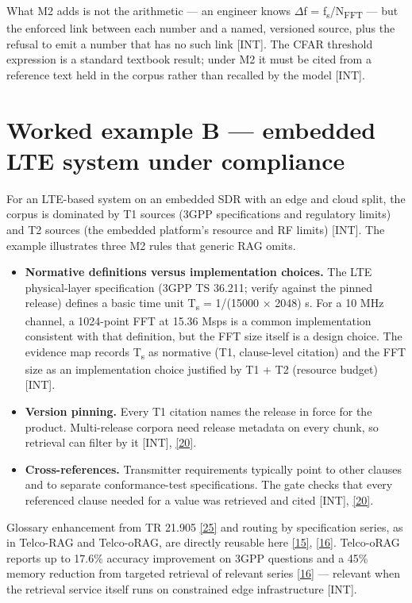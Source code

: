 \documentclass[11pt,a4paper]{article}
\newcommand{\prov}[1]{\textsf{\footnotesize[#1]}}
\begin{document}
What M2 adds is not the arithmetic --- an engineer knows \ensuremath{\Delta}f = f\textsubscript{s}/N\textsubscript{FFT} --- but the enforced link between each number and a named, versioned source, plus the refusal to emit a number that has no such link \prov{INT}. The CFAR threshold expression is a standard textbook result; under M2 it must be cited from a reference text held in the corpus rather than recalled by the model \prov{INT}.

\section{Worked example B --- embedded LTE system under compliance}
For an LTE-based system on an embedded SDR with an edge and cloud split, the corpus is dominated by T1 sources (3GPP specifications and regulatory limits) and T2 sources (the embedded platform's resource and RF limits) \prov{INT}. The example illustrates three M2 rules that generic RAG omits.

\begin{itemize}
\item \textbf{Normative definitions versus implementation choices.} The LTE physical-layer specification (3GPP TS 36.211; verify against the pinned release) defines a basic time unit T\textsubscript{s} = 1/(15000 \ensuremath{\times} 2048) s. For a 10 MHz channel, a 1024-point FFT at 15.36 Msps is a common implementation consistent with that definition, but the FFT size itself is a design choice. The evidence map records T\textsubscript{s} as normative (T1, clause-level citation) and the FFT size as an implementation choice justified by T1 + T2 (resource budget) \prov{INT}.
\item \textbf{Version pinning.} Every T1 citation names the release in force for the product. Multi-release corpora need release metadata on every chunk, so retrieval can filter by it \prov{INT}, \hyperlink{ref20}{[20]}.
\item \textbf{Cross-references.} Transmitter requirements typically point to other clauses and to separate conformance-test specifications. The gate checks that every referenced clause needed for a value was retrieved and cited \prov{INT}, \hyperlink{ref20}{[20]}.
\end{itemize}
Glossary enhancement from TR 21.905 \hyperlink{ref25}{[25]} and routing by specification series, as in Telco-RAG and Telco-oRAG, are directly reusable here \hyperlink{ref15}{[15]}, \hyperlink{ref16}{[16]}. Telco-oRAG reports up to 17.6\% accuracy improvement on 3GPP questions and a 45\% memory reduction from targeted retrieval of relevant series \hyperlink{ref16}{[16]} --- relevant when the retrieval service itself runs on constrained edge infrastructure \prov{INT}.
\end{document}
